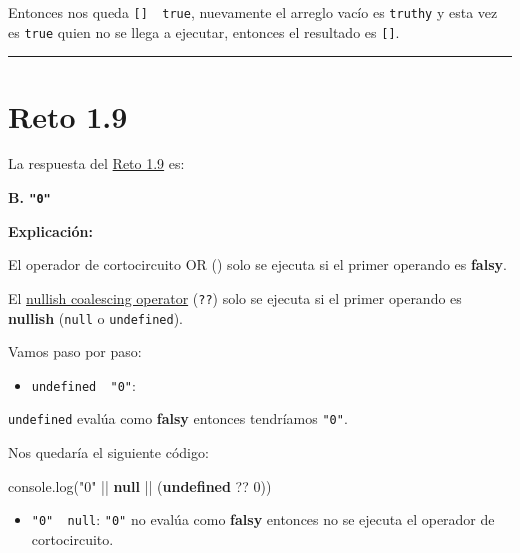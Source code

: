 \documentclass[
  letterpaper,
  DIV=11,
  numbers=noendperiod]{scrreprt}
\newenvironment{Shaded}{\begin{snugshade}}{\end{snugshade}}
\newcommand{\BuiltInTok}[1]{\textcolor[rgb]{0.00,0.23,0.31}{#1}}
\newcommand{\DecValTok}[1]{\textcolor[rgb]{0.68,0.00,0.00}{#1}}
\newcommand{\FunctionTok}[1]{\textcolor[rgb]{0.28,0.35,0.67}{#1}}
\newcommand{\KeywordTok}[1]{\textcolor[rgb]{0.00,0.23,0.31}{\textbf{#1}}}
\newcommand{\NormalTok}[1]{\textcolor[rgb]{0.00,0.23,0.31}{#1}}
\newcommand{\OperatorTok}[1]{\textcolor[rgb]{0.37,0.37,0.37}{#1}}
\newcommand{\StringTok}[1]{\textcolor[rgb]{0.13,0.47,0.30}{#1}}
\providecommand{\tightlist}{%
  \setlength{\itemsep}{0pt}\setlength{\parskip}{0pt}}
\begin{document}
Entonces nos queda \texttt{{[}{]}\ \textbar{}\textbar{}\ true},
nuevamente el arreglo vacío es \texttt{truthy} y esta vez es
\texttt{true} quien no se llega a ejecutar, entonces el resultado es
\texttt{{[}{]}}.

\begin{center}\rule{0.5\linewidth}{0.5pt}\end{center}

\section{Reto 1.9}\label{sec-sol-cap1-reto9}

La respuesta del \hyperref[sec-cap1-reto9]{Reto 1.9} es:

\textbf{B. \texttt{"0"}}

\textbf{Explicación:}

El operador de cortocircuito OR (\texttt{\textbar{}\textbar{}}) solo se
ejecuta si el primer operando es \textbf{falsy}.

El \hyperref[glos-nullish_coalescing]{nullish coalescing operator}
(\texttt{??}) solo se ejecuta si el primer operando es \textbf{nullish}
(\texttt{null} o \texttt{undefined}).

Vamos paso por paso:

\begin{itemize}
\tightlist
\item
  \texttt{undefined\ \textbar{}\textbar{}\ "0"}:
\end{itemize}

\texttt{undefined} evalúa como \textbf{falsy} entonces tendríamos
\texttt{"0"}.

Nos quedaría el siguiente código:

\begin{Shaded}
\begin{Highlighting}[]
\BuiltInTok{console}\OperatorTok{.}\FunctionTok{log}\NormalTok{(}\StringTok{"0"} \OperatorTok{||} \KeywordTok{null} \OperatorTok{||}\NormalTok{ (}\KeywordTok{undefined} \OperatorTok{??} \DecValTok{0}\NormalTok{))}
\end{Highlighting}
\end{Shaded}

\begin{itemize}
\tightlist
\item
  \texttt{"0"\ \textbar{}\textbar{}\ null}: \texttt{"0"} no evalúa como
  \textbf{falsy} entonces no se ejecuta el operador de cortocircuito.
\end{itemize}
\end{document}
